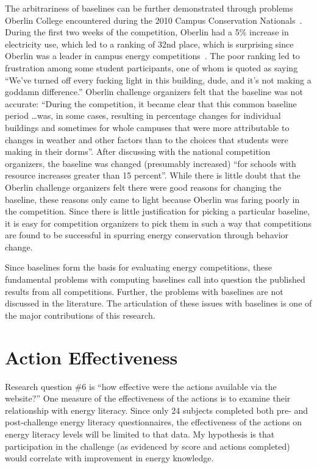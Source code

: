 The arbitrariness of baselines can be further demonstrated through problems Oberlin College encountered during the 2010 Campus Conservation Nationals~\cite{Willens2010}. During the first two weeks of the competition, Oberlin had a 5\% increase in electricity use, which led to a ranking of 32nd place, which is surprising since Oberlin was a leader in campus energy competitions~\cite{petersen-dorm-energy-reduction}. The poor ranking led to frustration among some student participants, one of whom is quoted as saying ``We've turned off every fucking light in this building, dude, and it's not making a goddamn difference.'' Oberlin challenge organizers felt that the baseline was not accurate: ``During the competition, it became clear that this common baseline period \ldots was, in some cases, resulting in percentage changes for individual buildings and sometimes for whole campuses that were more attributable to changes in weather and other factors than to the choices that students were making in their dorms''. After discussing with the national competition organizers, the baseline was changed (presumably increased) ``for schools with resource increases greater than 15 percent''. While there is little doubt that the Oberlin challenge organizers felt there were good reasons for changing the baseline, these reasons only came to light because Oberlin was faring poorly in the competition. Since there is little justification for picking a particular baseline, it is easy for competition organizers to pick them in such a way that competitions are found to be successful in spurring energy conservation through behavior change.

Since baselines form the basis for evaluating energy competitions, these fundamental problems with computing baselines call into question the published results from all competitions. Further, the problems with baselines are not discussed in the literature. The articulation of these issues with baselines is one of the major contributions of this research.


\section{Action Effectiveness}

Research question \#6 is ``how effective were the actions available via the website?'' One measure of the effectiveness of the actions is to examine their relationship with energy literacy. Since only 24 subjects completed both pre- and post-challenge energy literacy questionnaires, the effectiveness of the actions on energy literacy levels will be limited to that data. My hypothesis is that participation in the challenge (as evidenced by score and actions completed) would correlate with improvement in energy knowledge.

